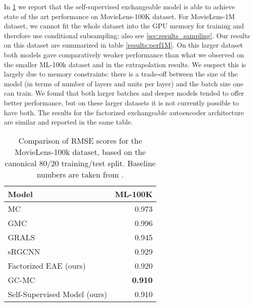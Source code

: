 \documentclass{article}
\newcommand{\tablefont}{\fontfamily{cmss}\fontseries{uc}\fontsize{10pt}{9pt}\selectfont\centering}
\theoremstyle{definition}
\begin{document}
In \cref{results:perf100k} we report that the self-supervised exchangeable model is able to achieve state of the art performance on 
MovieLens-100K dataset. For MovieLens-1M dataset, we cannot fit the whole dataset into the GPU memory for training and therefore use conditional subsampling; also see \cref{sec:results_sampling}. Our results on this dataset are summarized in table \cref{results:perf1M}. On this larger dataset both models gave comparatively weaker performance than what we observed on the smaller ML-100k dataset and in the extrapolation results. We suspect this is largely due to memory constraints: there is a trade-off between the size of the model (in terms of number of layers and units per layer) and the batch size one can train. We found that both larger batches and deeper models tended to offer better performance, but on these larger datasets it is not currently possible to have both.
The results for the factorized exchangeable autoencoder architecture are similar and reported in the same table.












\begin{table}[h]
\tablefont
\begin{tabular}{l r} 
  \toprule
  \textbf{Model} & \textbf{ML-100K} \\ [0.5ex] 
  \midrule
  MC {\smaller{\citep{candes2009exact}}} & 0.973 \\
  GMC {\smaller{\citep{kalofolias2014completion}}}  & 0.996 \\
  GRALS {\smaller{\citep{rao2015collab}}}  & 0.945 \\
  sRGCNN {\smaller{\citep{monti_geomatrix}}} & 0.929 \\
  Factorized EAE (ours)&0.920 \\
  GC-MC {\smaller{\citep{berg2017graph}}} & \textbf{0.910} \\
  Self-Supervised Model (ours) & 0.910 \\
\bottomrule
\end{tabular}
\caption {Comparison of RMSE scores for the MovieLens-100k dataset, based on the canonical 80/20 training/test split. Baseline numbers are taken from \citep{berg2017graph}.} \label{results:perf100k}
\end{table}
\end{document}

